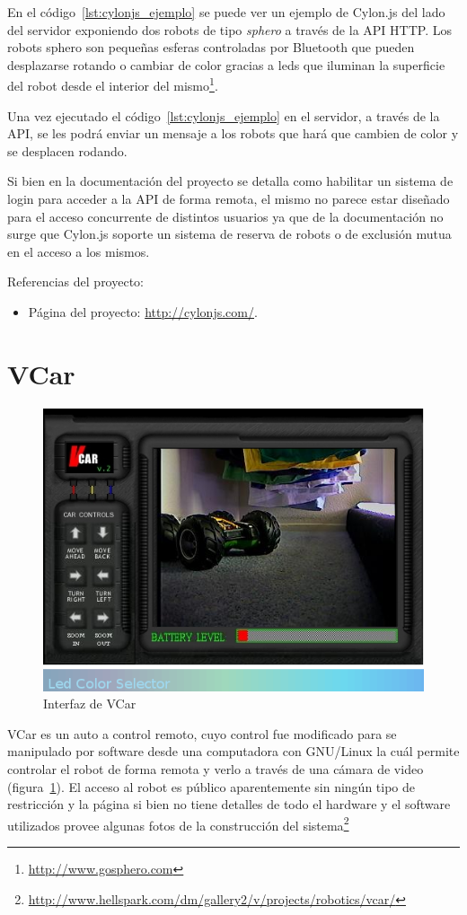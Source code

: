 En el código~\ref{lst:cylonjs_ejemplo} se puede ver un ejemplo de
Cylon.js del lado del servidor exponiendo dos robots de tipo
\textit{sphero} a través de la API HTTP. Los robots sphero son pequeñas
esferas controladas por Bluetooth que pueden desplazarse rotando o
cambiar de color gracias a
leds que iluminan la superficie del robot desde el interior del
mismo\footnote{\url{http://www.gosphero.com}}.

Una vez ejecutado el código~\ref{lst:cylonjs_ejemplo} en el servidor,
a través de la API, se
les podrá enviar un mensaje a los robots que hará que cambien
de color
y se desplacen
rodando.

Si bien en la documentación del proyecto se detalla como habilitar
un sistema de login para acceder a la API de forma remota, el mismo
no parece estar diseñado para el acceso concurrente de distintos usuarios
ya que de la documentación no surge que Cylon.js soporte un sistema
de reserva de robots o de exclusión mutua en el acceso a los mismos.

Referencias del proyecto:
\begin{itemize}
    \item Página del proyecto: \url{http://cylonjs.com/}.
\end{itemize}


\section{VCar}

\begin{figure}
    \centering
    \includegraphics[width=0.5\linewidth]{figures/vcar}
    \caption{Interfaz de VCar}
    \label{fig:vcar}
\end{figure}

VCar es un auto a control remoto, cuyo control fue modificado para
se manipulado por software desde  una computadora con GNU/Linux la
cuál permite controlar el robot de forma remota y verlo
a través de una cámara de
video
(figura~\ref{fig:vcar}).
El acceso al robot es público
aparentemente sin ningún tipo de restricción y la página
si bien no tiene detalles de todo el hardware y el software utilizados
provee algunas fotos de la construcción del
sistema\footnote{\url{http://www.hellspark.com/dm/gallery2/v/projects/robotics/vcar/}}

